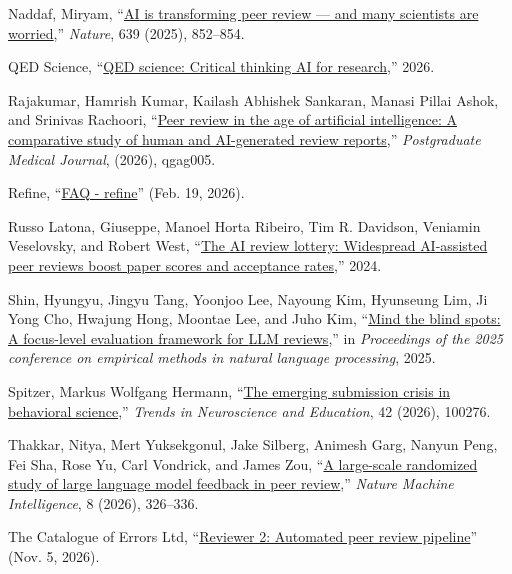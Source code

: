 \documentclass[
  11pt,
  letterpaper,
]{article}
\newlength{\cslhangindent}
\newenvironment{CSLReferences}[2] %
 {\begin{list}{}{%
  \setlength{\itemindent}{0pt}
  \setlength{\leftmargin}{0pt}
  \setlength{\parsep}{0pt}
  \ifodd #1
   \setlength{\leftmargin}{\cslhangindent}
   \setlength{\itemindent}{-1\cslhangindent}
  \fi
  \setlength{\itemsep}{#2\baselineskip}}}
 {\end{list}}
\begin{document}
\begin{CSLReferences}{1}{0}
Naddaf, Miryam,
{``\href{https://doi.org/10.1038/d41586-025-00894-7}{{AI} is
transforming peer review --- and many scientists are worried},''}
\emph{Nature}, 639 (2025), 852--854.

QED Science, {``\href{https://www.qedscience.com/}{QED science: Critical
thinking AI for research},''} 2026.

Rajakumar, Hamrish Kumar, Kailash Abhishek Sankaran, Manasi Pillai
Ashok, and Srinivas Rachoori,
{``\href{https://doi.org/10.1093/postmj/qgag005}{Peer review in the age
of artificial intelligence: A comparative study of human and
AI-generated review reports},''} \emph{Postgraduate Medical Journal},
(2026), qgag005.

Refine, {``\href{https://www.refine.ink/faq}{FAQ - refine}''} (Feb. 19,
2026).

Russo Latona, Giuseppe, Manoel Horta Ribeiro, Tim R. Davidson, Veniamin
Veselovsky, and Robert West,
{``\href{https://doi.org/10.48550/arXiv.2405.02150}{The {AI} review
lottery: Widespread {AI}-assisted peer reviews boost paper scores and
acceptance rates},''} 2024.

Shin, Hyungyu, Jingyu Tang, Yoonjoo Lee, Nayoung Kim, Hyunseung Lim, Ji
Yong Cho, Hwajung Hong, Moontae Lee, and Juho Kim,
{``\href{https://aclanthology.org/2025.emnlp-main.1805/}{Mind the blind
spots: A focus-level evaluation framework for {LLM} reviews},''} in
\emph{Proceedings of the 2025 conference on empirical methods in natural
language processing}, 2025.

Spitzer, Markus Wolfgang Hermann,
{``\href{https://doi.org/10.1016/j.tine.2026.100276}{The emerging
submission crisis in behavioral science},''} \emph{Trends in
Neuroscience and Education}, 42 (2026), 100276.

Thakkar, Nitya, Mert Yuksekgonul, Jake Silberg, Animesh Garg, Nanyun
Peng, Fei Sha, Rose Yu, Carl Vondrick, and James Zou,
{``\href{https://doi.org/10.1038/s42256-026-01188-x}{A large-scale
randomized study of large language model feedback in peer review},''}
\emph{Nature Machine Intelligence}, 8 (2026), 326--336.

The Catalogue of Errors Ltd,
{``\href{https://github.com/isitcredible/reviewer2}{Reviewer 2:
Automated peer review pipeline}''} (Nov. 5, 2026).


\end{CSLReferences}
\end{document}
